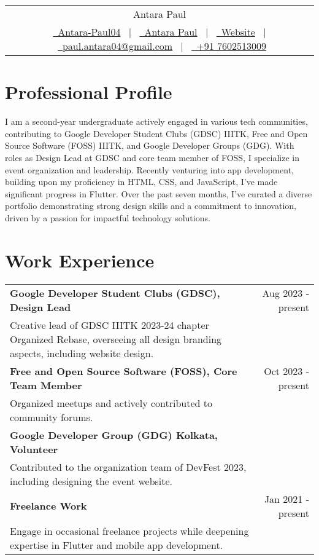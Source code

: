 \documentclass{article}
\begin{document}
\begin{tabularx}{\linewidth}{@{} C @{}}
\Huge{Antara Paul}\\[7.5pt]
\href{https://github.com/Antara-Paul04}{\raisebox{-0.05\height}{\faGithub}\ Antara-Paul04} \ $|$ \ 
\href{https://www.linkedin.com/in/antara-paul-069a37271/}{\raisebox{-0.05\height}{\faLinkedin}\ Antara Paul} \ $|$ \ 
\href{https://antara-paul04.github.io/Antara---Portfolio/}{\raisebox{-0.05\height}{\faGlobe}\ Website} \ $|$ \ 
\href{mailto:paul.antara04@gmail.com}{\raisebox{-0.05\height}{\faEnvelope}\ paul.antara04@gmail.com} \ $|$ \ 
\href{tel:+000000000000}{\raisebox{-0.05\height}{\faMobile}\ +91 7602513009}\\
\end{tabularx}

\section{Professional Profile}
I am a second-year undergraduate actively engaged in various tech communities, contributing to Google Developer Student Clubs (GDSC) IIITK, Free and Open Source Software (FOSS) IIITK, and Google Developer Groups (GDG). With roles as Design Lead at GDSC and core team member of FOSS, I specialize in event organization and leadership. Recently venturing into app development, building upon my proficiency in HTML, CSS, and JavaScript, I've made significant progress in Flutter. Over the past seven months, I've curated a diverse portfolio demonstrating strong design skills and a commitment to innovation, driven by a passion for impactful technology solutions. 

\section{Work Experience}

\begin{tabularx}{\linewidth}{ @{}l r@{} }
\textbf{Google Developer Student Clubs (GDSC), Design Lead} & \hfill Aug 2023 - present \\[3.5pt]
Creative lead of GDSC IIITK 2023-24 chapter
Organized Rebase, overseeing all design branding aspects, including website design. \\[4pt]
\textbf{Free and Open Source Software (FOSS), Core Team Member} & \hfill Oct 2023 - present \\[3.5pt]
Organized meetups and actively contributed to community forums. \\[4pt]
\textbf{Google Developer Group (GDG) Kolkata, Volunteer} & \\[3.5pt]
Contributed to the organization team of DevFest 2023, including designing the event website. \\[4pt]
\textbf{Freelance Work} & \hfill Jan 2021 - present \\[3.5pt]
Engage in occasional freelance projects while deepening expertise in Flutter and mobile app development. \\
\end{tabularx}
\end{document}
